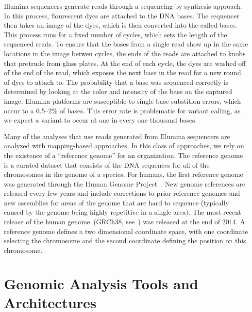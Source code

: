 \documentclass[phd]{ucbthesis}
\begin{document}
Illumina sequencers generate reads through a sequencing-by-synthesis approach.
In this process, flourescent dyes are attached to the DNA bases. The sequencer
then takes an image of the dyes, which is then converted into the called bases.
This process runs for a fixed number of cycles, which sets the length of the
sequenced reads. To ensure that the bases from a single read show up in the same
locations in the image betwen cycles, the ends of the reads are attached to
knobs that protrude from glass plates. At the end of each cycle, the dyes are
washed off of the end of the read, which exposes the next base in the read for
a new round of dyes to attach to. The probability that a base was sequenced
correctly is determined by looking at the color and intensity of the base on
the captured image. Illumina platforms are susceptible to single base substition
errors, which occur to a 0.5--2\% of bases. This error rate is problematic for
variant calling, as we expect a variant to occur at one in every one thousand
bases.

Many of the analyses that use reads generated from Illumina sequencers are
analyzed with mapping-based approaches. In this class of approaches, we rely on
the existence of a ``reference genome'' for an organization. The reference genome is a curated
dataset that consists of the DNA sequences for all of the chromosomes in the
genome of a species. For humans, the first reference genome was generated
through the Human Genome Project~\cite{lander01}. New genome references are
released every few years and include corrections to prior reference genomes
and new assemblies for areas of the genome that are hard to sequence (typically
caused by the genome being highly repetitive in a single area). The most recent
release of the human genome~(GRCh38, see~\cite{church15}) was released at the
end of 2014. A reference genome defines a two dimensional coordinate space, with
one coordinate selecting the chromosome and the second coordinate defining the
position on this chromosome.

\section{Genomic Analysis Tools and Architectures}
\label{sec:genomic-analysis}
\end{document}
